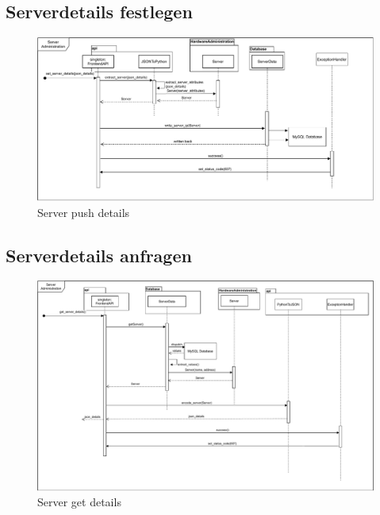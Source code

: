 \subsection{Serverdetails festlegen}
\begin{figure}[H]
	\includegraphics[width=1\textwidth]{res/Server_Sequence.drawio.pdf} 
	\caption{Server push details}
\end{figure}
\subsection{Serverdetails anfragen}
\begin{figure}[H]
	\includegraphics[width=1\textwidth]{res/server_get.drawio.pdf} 
	\caption{Server get details}
\end{figure}